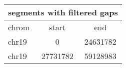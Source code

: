 \documentclass{standalone}
\begin{document}
\begin{tabular}{|l|c|c|}
\hline
\multicolumn{3}{|c|}{\textbf{segments with filtered gaps}}\\
\hline 

chrom & start & end \\
\hline
chr19 & 0 & 24631782 \\
chr19 & 27731782 & 59128983 \\
\hline
\end{tabular}
\end{document}
